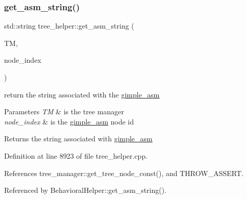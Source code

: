 \subsubsection{\texorpdfstring{get\+\_\+asm\+\_\+string()}{get\_asm\_string()}}
{\footnotesize\ttfamily std\+::string tree\+\_\+helper\+::get\+\_\+asm\+\_\+string (\begin{DoxyParamCaption}\item[{const \hyperlink{tree__manager_8hpp_a792e3f1f892d7d997a8d8a4a12e39346}{tree\+\_\+manager\+Const\+Ref} \&}]{TM,  }\item[{const unsigned int}]{node\+\_\+index }\end{DoxyParamCaption})\hspace{0.3cm}{\ttfamily [static]}}



return the string associated with the \hyperlink{structgimple__asm}{gimple\+\_\+asm} 


\begin{DoxyParams}{Parameters}
{\em TM} & is the tree manager \\
\hline
{\em node\+\_\+index} & is the \hyperlink{structgimple__asm}{gimple\+\_\+asm} node id \\
\hline
\end{DoxyParams}
\begin{DoxyReturn}{Returns}
the string associated with \hyperlink{structgimple__asm}{gimple\+\_\+asm} 
\end{DoxyReturn}


Definition at line 8923 of file tree\+\_\+helper.\+cpp.



References tree\+\_\+manager\+::get\+\_\+tree\+\_\+node\+\_\+const(), and T\+H\+R\+O\+W\+\_\+\+A\+S\+S\+E\+RT.



Referenced by Behavioral\+Helper\+::get\+\_\+asm\+\_\+string().

